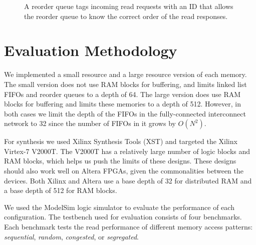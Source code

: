    \begin{figure}
        \center
        \caption{A reorder queue tags incoming read requests with an ID that allows the reorder queue to know the correct order of the read responses.}
        \label{fig:reordermemory}
    \end{figure}

\section{Evaluation Methodology}
\label{sec:evaluation}
    We implemented a small resource and a large resource version of each memory. The small version does not use RAM blocks for buffering, and limits linked list FIFOs and reorder queues to a depth of 64. The large version does use RAM blocks for buffering and limits these memories to a depth of 512. However, in both cases we limit the depth of the FIFOs in the fully-connected interconnect network to 32 since the number of FIFOs in it grows by $O(N^2)$.

    For synthesis we used Xilinx Synthesis Tools (XST) and targeted the Xilinx Virtex-7 V2000T. The V2000T has a relatively large number of logic blocks and RAM blocks, which helps us push the limits of these designs. These designs should also work well on Altera FPGAs, given the commonalities between the devices. Both Xilinx and Altera use a base depth of 32 for distributed RAM and a base depth of 512 for RAM blocks.

    We used the ModelSim logic simulator to evaluate the performance of each configuration. The testbench used for evaluation consists of four benchmarks. Each benchmark tests the read performance of different memory access patterns: {\em sequential}, {\em random}, {\em congested}, or {\em segregated}.

